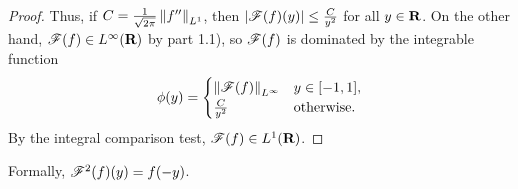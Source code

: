 \documentclass{homework}
\begin{document}
\begin{arabicparts}
\begin{proof}
			Thus, if $C = \frac{1}{\sqrt{2\pi}}\left\lVert f'' \right\rVert_{L^1}$, then $|\mathscr{F}(f)(y)|\le \frac{C}{y^2}$ for all $y \in \textnormal{\bf R}$. On the other hand, $\mathscr{F}(f) \in L^\infty(\textnormal{\bf R})$ by part 1.1), so $\mathscr{F}(f)$ is dominated by the integrable function
			\begin{equation}
				\phi(y) = \begin{cases}
					\left\lVert \mathscr{F}(f) \right\rVert_{L^\infty} & y \in [-1,1], \\
					\frac{C}{y^2} & \text{otherwise}.
				\end{cases}
			\end{equation}
			By the integral comparison test, $\mathscr{F}(f) \in L^1(\textnormal{\bf R})$.
		\end{proof}
		
		\questionpart Formally, $\mathscr{F}^2(f)(y) = f(-y)$.
		

\end{arabicparts}
\end{document}
